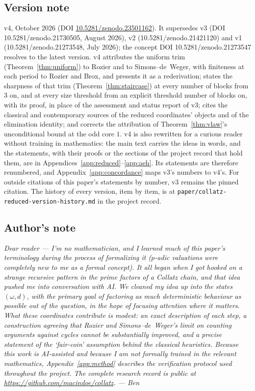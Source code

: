 \documentclass[11pt]{article}
\theoremstyle{remark}
\newcommand{\w}{\omega}
\newcommand{\vfourdoi}{\href{https://doi.org/10.5281/zenodo.23501162}{10.5281/zenodo.23501162}}
\begin{document}
\subsection*{Version note}
v4, October 2026 (DOI \vfourdoi). It supersedes v3 (DOI 10.5281/zenodo.21730505, August 2026), v2 (10.5281/zenodo.21421120) and v1 (10.5281/zenodo.21273548, July 2026); the concept DOI 10.5281/zenodo.21273547 resolves to the latest version. v4 attributes the uniform trim (Theorem~\ref{thm:uniform}) to Rozier and to Simons--de~Weger, with finiteness at each period to Rozier and Brox, and presents it as a rederivation; states the sharpness of that trim (Theorem~\ref{thm:staircase}) at every number of blocks from $3$ on, and at every size threshold from an explicit threshold number of blocks on, with its proof, in place of the assessment and status report of v3; cites the classical and contemporary sources of the reduced coordinates' objects and of the elimination identity; and corrects the attribution of Theorem~\ref{thm:vlaw}'s unconditional bound at the odd core $1$. v4 is also rewritten for a curious reader without training in mathematics: the main text carries the ideas in words, and the statements, with their proofs or the sections of the project record that hold them, are in Appendices~\ref{app:reduced}--\ref{app:aeh}. Its statements are therefore renumbered, and Appendix~\ref{app:concordance} maps v3's numbers to v4's. For outside citations of this paper's statements by number, v3 remains the pinned citation. The history of every version, item by item, is at \texttt{paper/collatz-reduced-version-history.md} in the project record.

\subsection*{Author's note}

\emph{Dear reader --- I'm no mathematician, and I learned much of this paper's terminology during the process of formalizing it ($p$-adic valuations were completely new to me as a formal concept). It all began when I got hooked on a strange recursive pattern in the prime factors of a Collatz chain, and that idea pushed me into conversation with AI.
We cleaned my idea up into the states $(\w,d)$, with the primary goal of factoring as much deterministic behaviour as possible out of the question, in the hope of focusing attention where it matters.
What these coordinates contribute is modest: an exact description of each step, a construction agreeing that Rozier and Simons--de~Weger's limit on counting arguments against cycles cannot be substantially improved, and a precise statement of the `fair-coin' assumption behind the classical heuristics. Because this work is AI-assisted and because I am not formally trained in the relevant mathematics, Appendix~\ref{app:method} describes the verification protocol used throughout the project. The complete research record is public at \url{https://github.com/macindoe/collatz}. --- Ben}
\end{document}
